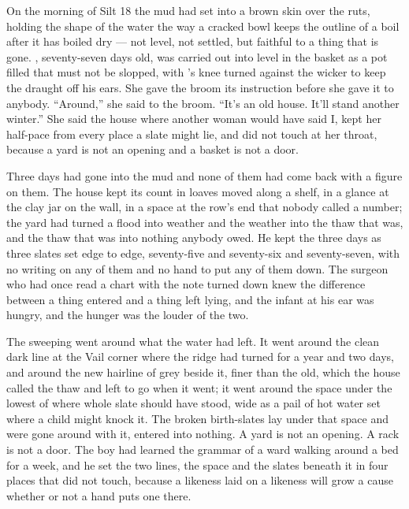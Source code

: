 
On the morning of Silt 18 the mud had set into a brown skin over the ruts, holding the shape of the water the way a cracked bowl keeps the outline of a boil after it has boiled dry --- not level, not settled, but faithful to a thing that is gone. , seventy-seven days old, was carried out into  level in the basket as a pot filled that must not be slopped, with 's knee turned against the wicker to keep the draught off his ears. She gave the broom its instruction before she gave it to anybody. “Around,” she said to the broom. “It's an old house. It'll stand another winter.” She said the house where another woman would have said I, kept her half-pace from every place a slate might lie, and did not touch  at her throat, because a yard is not an opening and a basket is not a door.

Three days had gone into the mud and none of them had come back with a figure on them. The house kept its count in loaves moved along a shelf, in a glance at the clay jar on the wall, in a space at the row's end that nobody called a number; the yard had turned a flood into weather and the weather into the thaw that was, and the thaw that was into nothing anybody owed. He kept the three days as three slates set edge to edge, seventy-five and seventy-six and seventy-seven, with no writing on any of them and no hand to put any of them down. The surgeon who had once read a chart with the note turned down knew the difference between a thing entered and a thing left lying, and the infant at his ear was hungry, and the hunger was the louder of the two.

The sweeping went around what the water had left. It went around the clean dark line at the Vail corner where the  ridge had turned for a year and two days, and around the new hairline of grey beside it, finer than the old, which the house called the thaw and left to go when it went; it went around the space under the lowest of  where whole slate should have stood, wide as a pail of hot water set where a child might knock it. The broken birth-slates lay under that space and were gone around with it, entered into nothing. A yard is not an opening. A rack is not a door. The boy had learned the grammar of a ward walking around a bed for a week, and he set the two lines, the space and the slates beneath it in four places that did not touch, because a likeness laid on a likeness will grow a cause whether or not a hand puts one there.


